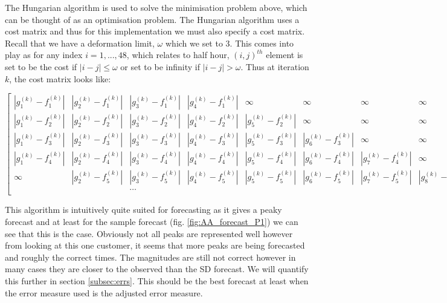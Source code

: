The Hungarian algorithm is used to solve the minimisation problem above, which can be thought of as an optimisation problem. The Hungarian algorithm uses a cost matrix and thus for this implementation we must also specify a cost matrix. Recall that we have a deformation limit, $\omega$ which we set to 3. This comes into play as for any index $i = 1, ..., 48$, which relates to half hour, $(i,j)^{th}$ element is set to be the cost if $|i-j|\le\omega$ or set to be infinity if $|i-j| > \omega$. Thus at iteration $k$, the cost matrix looks like: \newline

\begin{tiny}\centerline{$\begin{bmatrix}
    |g_1^{(k)} - f_1^{(k)}| & |g_2^{(k)} - f_1^{(k)}| & |g_3^{(k)} - f_1^{(k)}| & |g_4^{(k)} -f_1^{(k)}| & \infty  & \infty& \infty & \infty & \dots & \infty \\
    |g_1^{(k)} - f_2^{(k)}| & |g_2^{(k)} - f_2^{(k)}| & |g_3^{(k)} - f_2^{(k)}| &  |g_4^{(k)} - f_2^{(k)}| & |g_5^{(k)} - f_2^{(k)}| & \infty & \infty &\infty & \dots & \infty\\
    |g_1^{(k)} - f_3^{(k)}| & |g_2^{(k)} - f_3^{(k)}| & |g_3^{(k)} - f_3^{(k)}| &  |g_4^{(k)} - f_3^{(k)}|& |g_5^{(k)}- f_3^{(k)}| & |g_6^{(k)}-f_3^{(k)}| & \infty & \infty & \dots  & \infty\\
    |g_1^{(k)}-f_4^{(k)}| & |g_2^{(k)} - f_4^{(k)}| & |g_3^{(k)} - f_4^{(k)}| & |g_4^{(k)} - f_4^{(k)}| &  |g_5^{(k)} - f_4^{(k)}| & |g_6^{(k)}- f_4^{(k)}|& |g_7^{(k)} - f_4^{(k)}| &\infty &\dots & \infty\\
    \infty & |g_2^{(k)} - f_5^{(k)}| & |g_3^{(k)} - f_5^{(k)}| & |g_4^{(k)} - f_5^{(k)}| &  |g_5^{(k)} - f_5^{(k)}|& |g_6^{(k)}- f_5^{(k)}|& |g_7^{(k)} - f_5^{(k)}| &|g_8^{(k)} - f_5^{(k)}| &\dots & \infty\\
     &  & \dots &  & &  & &  & \\
\end{bmatrix}$} \end{tiny}

This algorithm is intuitively quite suited for forecasting as it gives a peaky forecast and at least for the sample forecast (fig. \ref{fig:AA_forecast_P1}) we can see that this is the case. Obviously not all peaks are represented well however from looking at this one customer, it seems that more peaks are being forecasted and roughly the correct times. The magnitudes are still not correct however in many cases they are closer to the observed than the SD forecast. We will quantify this further in section \ref{subsec:errs}. This should be the best forecast at least when the error measure used is the adjusted error measure.

